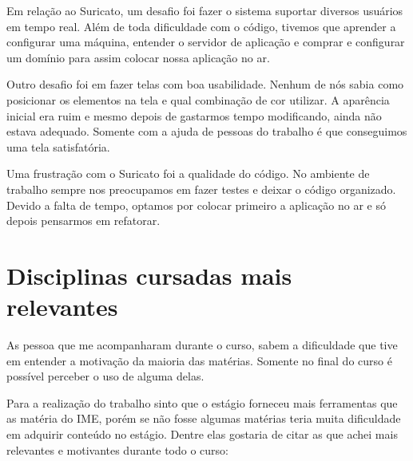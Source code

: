 \documentclass[titlepage,a4paper]{article}
\begin{document}
Em relação ao Suricato, um desafio foi fazer o sistema suportar diversos usuários em tempo real. Além de toda dificuldade com o código, tivemos que aprender a configurar uma máquina, entender o servidor de aplicação e comprar e configurar um domínio para assim colocar nossa aplicação no ar.

Outro desafio foi em fazer telas com boa usabilidade. Nenhum de nós sabia como posicionar os elementos na tela e qual combinação de cor utilizar. A aparência inicial era ruim e mesmo depois de gastarmos tempo modificando, ainda não estava adequado. Somente com a ajuda de pessoas do trabalho é que conseguimos uma tela satisfatória.

Uma frustração com o Suricato foi a qualidade do código. No ambiente de trabalho sempre nos preocupamos em fazer testes e deixar o código organizado. Devido a falta de tempo, optamos por colocar primeiro a aplicação no ar e só depois pensarmos em refatorar.


\section{Disciplinas cursadas mais relevantes}

As pessoa que me acompanharam durante o curso, sabem a dificuldade que tive em entender a motivação da maioria das matérias. Somente no final do curso é possível perceber o uso de alguma delas. 

Para a realização do trabalho sinto que o estágio forneceu mais ferramentas que as matéria do IME, porém se não fosse algumas matérias teria muita dificuldade em adquirir conteúdo no estágio. Dentre elas gostaria de citar as que achei mais relevantes e motivantes durante todo o curso:
\end{document}
